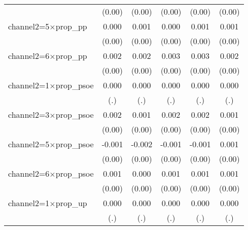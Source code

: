 \begin{table}[htbp]
\begin{tabular}{l*{5}{c}}
                    &      (0.00)         &      (0.00)         &      (0.00)         &      (0.00)         &      (0.00)         \\
channel2=5$\times$prop\_pp&       0.000         &       0.001         &       0.000         &       0.001         &       0.001         \\
                    &      (0.00)         &      (0.00)         &      (0.00)         &      (0.00)         &      (0.00)         \\
channel2=6$\times$prop\_pp&       0.002\sym{*}  &       0.002\sym{*}  &       0.003\sym{***}&       0.003\sym{***}&       0.002\sym{*}  \\
                    &      (0.00)         &      (0.00)         &      (0.00)         &      (0.00)         &      (0.00)         \\
channel2=1$\times$prop\_psoe&       0.000         &       0.000         &       0.000         &       0.000         &       0.000         \\
                    &         (.)         &         (.)         &         (.)         &         (.)         &         (.)         \\
channel2=3$\times$prop\_psoe&       0.002         &       0.001         &       0.002         &       0.002         &       0.001         \\
                    &      (0.00)         &      (0.00)         &      (0.00)         &      (0.00)         &      (0.00)         \\
channel2=5$\times$prop\_psoe&      -0.001         &      -0.002         &      -0.001         &      -0.001         &       0.001         \\
                    &      (0.00)         &      (0.00)         &      (0.00)         &      (0.00)         &      (0.00)         \\
channel2=6$\times$prop\_psoe&       0.001         &       0.000         &       0.001         &       0.001         &       0.001         \\
                    &      (0.00)         &      (0.00)         &      (0.00)         &      (0.00)         &      (0.00)         \\
channel2=1$\times$prop\_up&       0.000         &       0.000         &       0.000         &       0.000         &       0.000         \\
                    &         (.)         &         (.)         &         (.)         &         (.)         &         (.)         \\

\end{tabular}
\end{table}
